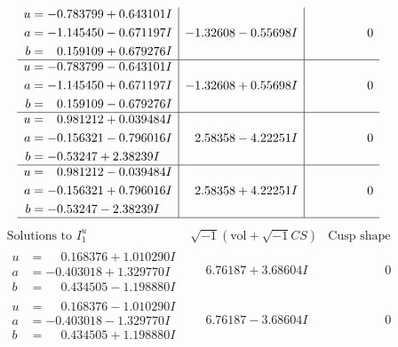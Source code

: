 \documentclass[1p]{elsarticle_modified}
\theoremstyle{definition}
\newcommand{\I}{\sqrt{-1}}
\begin{document}
$$\begin{array}{c|c|c}
\begin{aligned}
u &= -0.783799 + 0.643101 I \\
a &= -1.145450 - 0.671197 I \\
b &= \phantom{-}0.159109 + 0.679276 I\end{aligned}
 & -1.32608 - 0.55698 I & \phantom{-0.000000 } 0 \\ \hline\begin{aligned}
u &= -0.783799 - 0.643101 I \\
a &= -1.145450 + 0.671197 I \\
b &= \phantom{-}0.159109 - 0.679276 I\end{aligned}
 & -1.32608 + 0.55698 I & \phantom{-0.000000 } 0 \\ \hline\begin{aligned}
u &= \phantom{-}0.981212 + 0.039484 I \\
a &= -0.156321 - 0.796016 I \\
b &= -0.53247 + 2.38239 I\end{aligned}
 & \phantom{-}2.58358 - 4.22251 I & \phantom{-0.000000 } 0 \\ \hline\begin{aligned}
u &= \phantom{-}0.981212 - 0.039484 I \\
a &= -0.156321 + 0.796016 I \\
b &= -0.53247 - 2.38239 I\end{aligned}
 & \phantom{-}2.58358 + 4.22251 I & \phantom{-0.000000 } 0\\
 \hline 
 \end{array}$$\newpage$$\begin{array}{c|c|c}  
\text{Solutions to }I^u_{1}& \I (\text{vol} + \sqrt{-1}CS) & \text{Cusp shape}\\
 \hline 
\begin{aligned}
u &= \phantom{-}0.168376 + 1.010290 I \\
a &= -0.403018 + 1.329770 I \\
b &= \phantom{-}0.434505 - 1.198880 I\end{aligned}
 & \phantom{-}6.76187 + 3.68604 I & \phantom{-0.000000 } 0 \\ \hline\begin{aligned}
u &= \phantom{-}0.168376 - 1.010290 I \\
a &= -0.403018 - 1.329770 I \\
b &= \phantom{-}0.434505 + 1.198880 I\end{aligned}
 & \phantom{-}6.76187 - 3.68604 I & \phantom{-0.000000 } 0 \\ \hline\begin{aligned}

\end{aligned}
\end{array}$$
\end{document}
